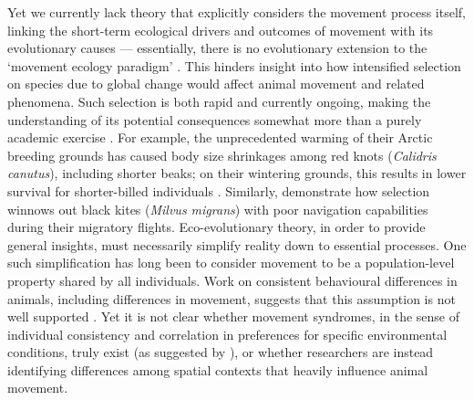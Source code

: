 Yet we currently lack theory that explicitly considers the movement process itself, linking the short-term ecological drivers and outcomes of movement with its evolutionary causes --- essentially, there is no evolutionary extension to the `movement ecology paradigm' \citep{holyoak2008,nathan2008a}.
This hinders insight into how intensified selection on species due to global change would affect animal movement and related phenomena.
Such selection is both rapid and currently ongoing, making the understanding of its potential consequences somewhat more than a purely academic exercise \parencite{bonnet2022}.
For example, the unprecedented warming of their Arctic breeding grounds has caused body size shrinkages among red knots (\emph{Calidris canutus}), including shorter beaks; on their wintering grounds, this results in lower survival for shorter-billed individuals \citep[e.g.][]{vangils2016}.
Similarly, \textcite{sergio2022} demonstrate how selection winnows out black kites (\emph{Milvus migrans}) with poor navigation capabilities during their migratory flights.
Eco-evolutionary theory, in order to provide general insights, must necessarily simplify reality down to essential processes.
One such simplification has long been to consider movement to be a population-level property shared by all individuals.
Work on consistent behavioural differences in animals, including differences in movement, suggests that this assumption is not well supported \citep{spiegel2017,shaw2020,stuber2022,webber2018,webber2020,abrahms2017}.
Yet it is not clear whether movement syndromes, in the sense of individual consistency and correlation in preferences for specific environmental conditions, truly exist (as suggested by \cite{stuber2022}), or whether researchers are instead identifying differences among spatial contexts that heavily influence animal movement.

